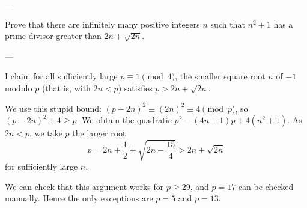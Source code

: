 
---

Prove that there are infinitely many positive integers $n$ such that $n^2+1$ has a prime divisor greater than $2n+\sqrt{2n}$.

---

I claim for all sufficiently large $p\equiv1\pmod4$, the smaller square root $n$ of $-1$ modulo $p$ (that is, with $2n<p$) satisfies $p>2n+\sqrt{2n}$.

We use this stupid bound: $(p-2n)^2\equiv(2n)^2\equiv4\pmod p$, so $(p-2n)^2+4\ge p$. We obtain the quadratic $p^2-(4n+1)p+4\left(n^2+1\right)$. As $2n<p$, we take $p$ the larger root \[p=2n+\frac12+\sqrt{2n-\frac{15}4}>2n+\sqrt{2n}\]
for sufficiently large $n$.
\begin{remark}
    We can check that this argument works for $p\ge29$, and $p=17$ can be checked manually. Hence the only exceptions are $p=5$ and $p=13$.
\end{remark}


